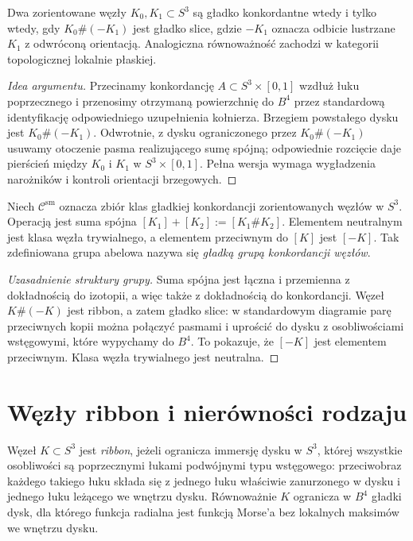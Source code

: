 \begin{stwierdzenie}
Dwa zorientowane węzły $K_0,K_1\subset S^3$ są gładko
konkordantne wtedy i tylko wtedy, gdy
$K_0\#(-K_1)$ jest gładko slice, gdzie $-K_1$
oznacza odbicie lustrzane $K_1$ z odwróconą orientacją.
Analogiczna równoważność zachodzi w kategorii topologicznej
lokalnie płaskiej.
\end{stwierdzenie}

\begin{proof}[Idea argumentu]
Przecinamy konkordancję $A\subset S^3\times[0,1]$
wzdłuż łuku poprzecznego i przenosimy otrzymaną powierzchnię
do $B^4$ przez standardową identyfikację odpowiedniego
uzupełnienia kołnierza. Brzegiem powstałego dysku jest
$K_0\#(-K_1)$. Odwrotnie, z dysku ograniczonego przez
$K_0\#(-K_1)$ usuwamy otoczenie pasma realizującego sumę
spójną; odpowiednie rozcięcie daje pierścień między
$K_0$ i $K_1$ w $S^3\times[0,1]$.
Pełna wersja wymaga wygładzenia narożników i kontroli
orientacji brzegowych.
\end{proof}

\begin{definicja}
Niech $\mathcal C^{\mathrm{sm}}$ oznacza zbiór klas gładkiej
konkordancji zorientowanych węzłów w $S^3$.
Operacją jest suma spójna $[K_1]+[K_2]:=[K_1\#K_2]$.
Elementem neutralnym jest klasa węzła trywialnego,
a elementem przeciwnym do $[K]$ jest $[-K]$.
Tak zdefiniowana grupa abelowa nazywa się
\emph{gładką grupą konkordancji węzłów}.
\end{definicja}

\begin{proof}[Uzasadnienie struktury grupy]
Suma spójna jest łączna i przemienna z dokładnością
do izotopii, a więc także z dokładnością do konkordancji.
Węzeł $K\#(-K)$ jest ribbon, a zatem gładko slice:
w standardowym diagramie parę przeciwnych kopii można
połączyć pasmami i uprościć do dysku z osobliwościami
wstęgowymi, które wypychamy do $B^4$. To pokazuje, że
$[-K]$ jest elementem przeciwnym. Klasa węzła trywialnego
jest neutralna.
\end{proof}

\section{Węzły ribbon i nierówności rodzaju}
\label{sec:kt-ribbon}

\begin{definicja}
Węzeł $K\subset S^3$ jest \emph{ribbon}, jeżeli ogranicza
immersję dysku w $S^3$, której wszystkie osobliwości
są poprzecznymi łukami podwójnymi typu wstęgowego:
przeciwobraz każdego takiego łuku składa się z jednego
łuku właściwie zanurzonego w dysku i jednego łuku leżącego
we wnętrzu dysku. Równoważnie $K$ ogranicza w $B^4$
gładki dysk, dla którego funkcja radialna jest funkcją
Morse'a bez lokalnych maksimów we wnętrzu dysku.
\end{definicja}

